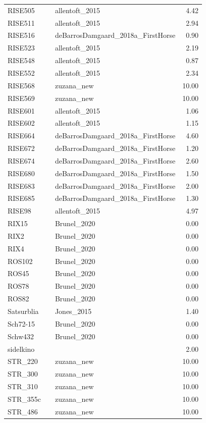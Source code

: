 \begin{longtable}[t]{lllr}
RISE505 &  & allentoft\_2015 & 4.42\\
RISE511 &  & allentoft\_2015 & 2.94\\
RISE516 &  & deBarrosDamgaard\_2018a\_FirstHorse & 0.90\\
RISE523 &  & allentoft\_2015 & 2.19\\
RISE548 &  & allentoft\_2015 & 0.87\\
RISE552 &  & allentoft\_2015 & 2.34\\
RISE568 &  & zuzana\_new & 10.00\\
RISE569 &  & zuzana\_new & 10.00\\
RISE601 &  & allentoft\_2015 & 1.06\\
RISE602 &  & allentoft\_2015 & 1.15\\
RISE664 &  & deBarrosDamgaard\_2018a\_FirstHorse & 4.60\\
RISE672 &  & deBarrosDamgaard\_2018a\_FirstHorse & 1.20\\
RISE674 &  & deBarrosDamgaard\_2018a\_FirstHorse & 2.60\\
RISE680 &  & deBarrosDamgaard\_2018a\_FirstHorse & 1.50\\
RISE683 &  & deBarrosDamgaard\_2018a\_FirstHorse & 2.00\\
RISE685 &  & deBarrosDamgaard\_2018a\_FirstHorse & 1.30\\
RISE98 &  & allentoft\_2015 & 4.97\\
RIX15 &  & Brunel\_2020 & 0.00\\
RIX2 &  & Brunel\_2020 & 0.00\\
RIX4 &  & Brunel\_2020 & 0.00\\
ROS102 &  & Brunel\_2020 & 0.00\\
ROS45 &  & Brunel\_2020 & 0.00\\
ROS78 &  & Brunel\_2020 & 0.00\\
ROS82 &  & Brunel\_2020 & 0.00\\
Satsurblia &  & Jones\_2015 & 1.40\\
Sch72-15 &  & Brunel\_2020 & 0.00\\
Schw432 &  & Brunel\_2020 & 0.00\\
sidelkino &  &  & 2.00\\
STR\_220 &  & zuzana\_new & 10.00\\
STR\_300 &  & zuzana\_new & 10.00\\
STR\_310 &  & zuzana\_new & 10.00\\
STR\_355c &  & zuzana\_new & 10.00\\
STR\_486 &  & zuzana\_new & 10.00\\

\end{longtable}
